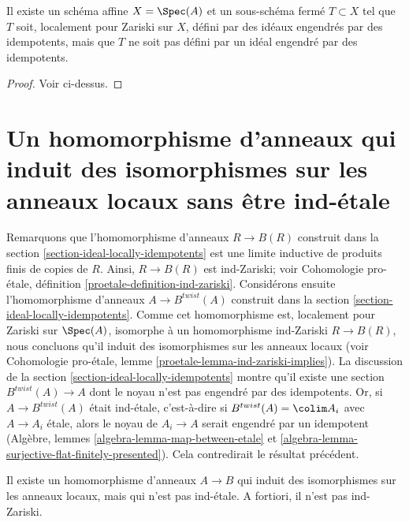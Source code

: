 \begin{lemma}
\label{lemma-not-generated-idempotents}
Il existe un schéma affine $X = \Spec(A)$ et un
sous-schéma fermé $T \subset X$ tel que $T$ soit, localement pour Zariski
sur $X$, défini par des idéaux engendrés par des idempotents, mais que
$T$ ne soit pas défini par un idéal engendré par des idempotents.
\end{lemma}

\begin{proof}
Voir ci-dessus.
\end{proof}



\section{Un homomorphisme d'anneaux qui induit des isomorphismes sur les anneaux locaux sans être ind-\'etale}
\label{section-not-ind-etale}

\noindent
Remarquons que l'homomorphisme d'anneaux $R \to B(R)$ construit dans la
section \ref{section-ideal-locally-idempotents} est
une limite inductive de produits finis de copies de $R$. Ainsi, $R \to B(R)$
est ind-Zariski; voir
Cohomologie pro-\'etale, définition \ref{proetale-definition-ind-zariski}.
Considérons ensuite l'homomorphisme d'anneaux $A \to B^{twist}(A)$
construit dans la section \ref{section-ideal-locally-idempotents}.
Comme cet homomorphisme est, localement pour Zariski sur $\Spec(A)$, isomorphe à un
homomorphisme ind-Zariski $R \to B(R)$, nous concluons qu'il induit des isomorphismes sur les anneaux locaux
(voir Cohomologie pro-\'etale, lemme \ref{proetale-lemma-ind-zariski-implies}).
La discussion de la section \ref{section-ideal-locally-idempotents}
montre qu'il existe une section
$B^{twist}(A) \to A$ dont le noyau n'est pas engendré par des idempotents.
Or, si $A \to B^{twist}(A)$ était ind-\'etale, c'est-à-dire si
$B^{twist}(A) = \colim A_i$ avec $A \to A_i$ \'etale,
alors le noyau de $A_i \to A$ serait engendré par un idempotent
(Algèbre, lemmes \ref{algebra-lemma-map-between-etale} et
\ref{algebra-lemma-surjective-flat-finitely-presented}).
Cela contredirait le résultat précédent.

\begin{lemma}
\label{lemma-not-ind-etale}
Il existe un homomorphisme d'anneaux $A \to B$ qui induit des isomorphismes sur les anneaux locaux, mais
qui n'est pas ind-\'etale. A fortiori, il n'est pas ind-Zariski.
\end{lemma}

